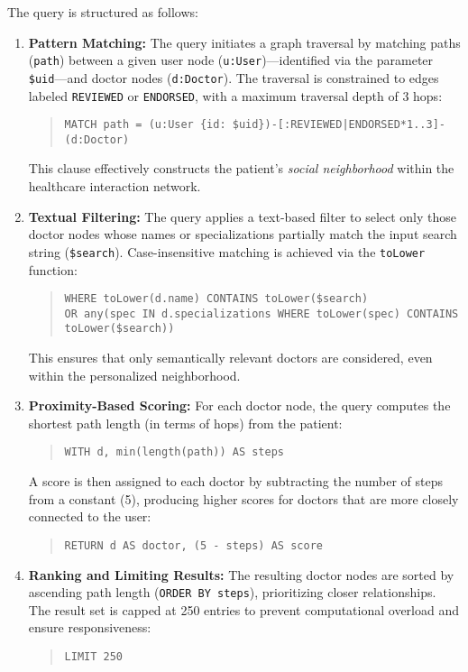 The query is structured as follows:
\begin{enumerate}
	\item \textbf{Pattern Matching:} 
	The query initiates a graph traversal by matching paths (\texttt{path}) between a given user node (\texttt{u:User})—identified via the parameter \texttt{\$uid}—and doctor nodes (\texttt{d:Doctor}). The traversal is constrained to edges labeled \texttt{REVIEWED} or \texttt{ENDORSED}, with a maximum traversal depth of 3 hops:
	\begin{quote}
		\texttt{MATCH path = (u:User \{id: \$uid\})-[:REVIEWED|ENDORSED*1..3]-(d:Doctor)}
	\end{quote}
	This clause effectively constructs the patient's \textit{social neighborhood} within the healthcare interaction network.
	
	\item \textbf{Textual Filtering:}
	The query applies a text-based filter to select only those doctor nodes whose names or specializations partially match the input search string (\texttt{\$search}). Case-insensitive matching is achieved via the \texttt{toLower} function:
	\begin{quote}
		\texttt{WHERE toLower(d.name) CONTAINS toLower(\$search)}\\
		\texttt{OR any(spec IN d.specializations WHERE toLower(spec) CONTAINS toLower(\$search))}
	\end{quote}
	This ensures that only semantically relevant doctors are considered, even within the personalized neighborhood.
	
	\item \textbf{Proximity-Based Scoring:}
	For each doctor node, the query computes the shortest path length (in terms of hops) from the patient:
	\begin{quote}
		\texttt{WITH d, min(length(path)) AS steps}
	\end{quote}
	A score is then assigned to each doctor by subtracting the number of steps from a constant (5), producing higher scores for doctors that are more closely connected to the user:
	\begin{quote}
		\texttt{RETURN d AS doctor, (5 - steps) AS score}
	\end{quote}
	
	\item \textbf{Ranking and Limiting Results:}
	The resulting doctor nodes are sorted by ascending path length (\texttt{ORDER BY steps}), prioritizing closer relationships. The result set is capped at 250 entries to prevent computational overload and ensure responsiveness:
	\begin{quote}
		\texttt{LIMIT 250}
	\end{quote}
\end{enumerate}

